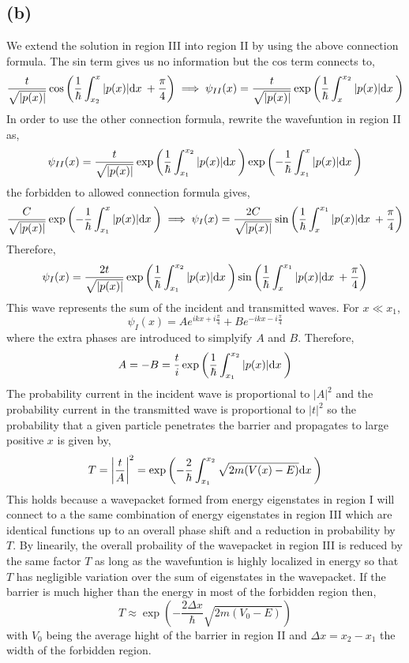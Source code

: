 \documentclass[12pt]{extarticle}
\begin{document}
\subsection*{(b)}
We extend the solution in region III into region II by using the above connection formula. The sin term gives us no information but the cos term connects to,
\[ \frac{t}{\sqrt{|p(x)|}} \cos{\left(\frac{1}{\hbar} \int_{x_2}^x |p(x)|  \mathrm{d}x \: + \frac{\pi}{4} \right)} \implies \psi_{II}(x) = \frac{t}{\sqrt{|p(x)|}} \exp{\left(\frac{1}{\hbar} \int_{x}^{x_2} |p(x)|  \mathrm{d}x \: \right)}\]
In order to use the other connection formula, rewrite the wavefuntion in region II as,
\[\psi_{II}(x) = \frac{t}{\sqrt{|p(x)|}} \exp{\left(\frac{1}{\hbar} \int_{x_1}^{x_2} |p(x)|  \mathrm{d}x \: \right)} \exp{\left(-\frac{1}{\hbar} \int_{x_1}^{x} |p(x)|  \mathrm{d}x \: \right)} \]
the forbidden to allowed connection formula gives,
\[\frac{C}{\sqrt{|p(x)|}} \exp{\left(-\frac{1}{\hbar} \int_{x_1}^{x} |p(x)|  \mathrm{d}x \: \right)} \implies \psi_I(x) = \frac{2C}{\sqrt{|p(x)|}} \sin{\left( \frac{1}{\hbar} \int_{x}^{x_1} |p(x)|  \mathrm{d}x \: + \frac{\pi}{4} \right)} \]
Therefore, 
\[\psi_I(x) = \frac{2t}{\sqrt{|p(x)|}} \exp{\left(\frac{1}{\hbar} \int_{x_1}^{x_2} |p(x)|  \mathrm{d}x \: \right)} \sin{\left( \frac{1}{\hbar} \int_{x}^{x_1} |p(x)|  \mathrm{d}x \: + \frac{\pi}{4} \right)} \]
This wave represents the sum of the incident and transmitted waves. For $x \ll x_1$,
\[\psi_I(x) = A e^{ikx + i\frac{\pi}{4}} + Be^{-ikx - i\frac{\pi}{4}} \]
where the extra phases are introduced to simplyify $A$ and $B$. Therefore, 
\[A = -B = \frac{t}{i} \exp{\left(\frac{1}{\hbar} \int_{x_1}^{x_2} |p(x)|  \mathrm{d}x \: \right)} \] 
The probability current in the incident wave is proportional to $|A|^2$ and the probability current in the transmitted wave is proportional to $|t|^2$ so the probability that a given particle penetrates the barrier and propagates to large positive $x$ is given by,
\[T = \left|\frac{t}{A} \right|^2 = \exp{\left( - \frac{2}{\hbar} \int_{x_1}^{x_2} \sqrt{2m(V(x) - E)}  \mathrm{d}x \: \right)} \]
This holds because a wavepacket formed from energy eigenstates in region I will connect to a the same combination of energy eigenstates in region III which are identical functions up to an overall phase shift and a reduction in probability by $T$. By linearily, the overall probaility of the wavepacket in region III is reduced by the same factor $T$ as long as the wavefuntion is highly localized in energy so that $T$ has negligible variation over the sum of eigenstates in the wavepacket. If the barrier is much higher than the energy in most of the forbidden region then,
\[T \approx \exp{\left( - \frac{2 \Delta x }{\hbar}\sqrt{2m(V_0 - E)} \right)} \]
with $V_0$ being the average hight of the barrier in region II and $\Delta x = x_2 - x_1$ the width of the forbidden region. 
\end{document}
